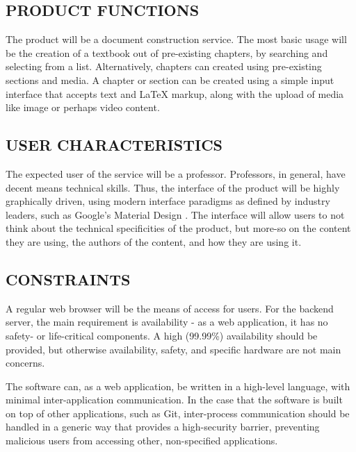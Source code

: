 \documentclass[letterpaper, 10pt, draftclsnofoot, compsoc, onecolumn]{IEEEtran}
\begin{document}
\subsection[PRODUCT FUNCTIONS]{\rmfamily\bfseries\color{black} PRODUCT FUNCTIONS}

{\noindent 
The product will be a document construction service. The most basic usage will be the 
creation of a textbook out of pre-existing chapters, by searching and selecting from a 
list. Alternatively, chapters can created using pre-existing sections and media.
A chapter or section can be created using a simple input interface that
accepts text and LaTeX markup, along with the upload of media like image or
perhaps video content.}

\subsection[USER CHARACTERISTICS]{\rmfamily\bfseries\color{black} USER CHARACTERISTICS}

{\noindent 
The expected user of the service will be a professor. Professors, in general, have
decent means technical skills. Thus, the interface of the product
will be highly graphically driven, using modern interface paradigms as defined
by industry leaders, such as Google's Material Design \cite{GoogleMaterial}. 
The interface will allow users to not think about the technical specificities of the product, 
but more-so on the content they are using, the authors of the content, and how they are using it.}

\subsection[CONSTRAINTS]{\rmfamily\bfseries\color{black} CONSTRAINTS}

{\noindent 
A regular web browser will be the means of access for users. For the backend
server, the main requirement is availability - as a web application, it has no
safety- or life-critical components. A high (99.99\%) availability should be provided,
but otherwise availability, safety, and specific hardware are not main concerns.}

\bigskip

{\noindent 
The software can, as a web application, be written in a high-level language, with
minimal inter-application communication. In the case that the software is built
on top of other applications, such as Git, inter-process communication should be
handled in a generic way that provides a high-security barrier, preventing malicious
users from accessing other, non-specified applications.}
\end{document}
